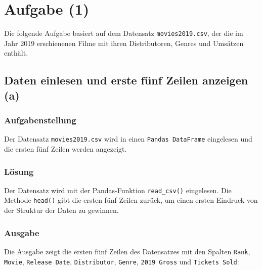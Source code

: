 
\chapter{Aufgabe (1)}
\label{chap:Aufgabe1}
\thispagestyle{fancy}

Die folgende Aufgabe basiert auf dem Datensatz \texttt{movies2019.csv}, der die im Jahr 2019 erschienenen Filme mit ihren Distributoren, Genres und Umsätzen enthält.


\section{Daten einlesen und erste fünf Zeilen anzeigen (a)}
\label{sec:1a}

\subsection{Aufgabenstellung}

Der Datensatz \texttt{movies2019.csv} wird in einen \texttt{Pandas DataFrame} eingelesen und die ersten fünf Zeilen werden angezeigt.

\subsection{Lösung}

Der Datensatz wird mit der Pandas-Funktion \texttt{read\_csv()} eingelesen. Die Methode \texttt{head()} gibt die ersten fünf Zeilen zurück, um einen ersten Eindruck von der Struktur der Daten zu gewinnen.



\subsection{Ausgabe}

Die Ausgabe zeigt die ersten fünf Zeilen des Datensatzes mit den Spalten \texttt{Rank}, \texttt{Movie}, \texttt{Release Date}, \texttt{Distributor}, \texttt{Genre}, \texttt{2019 Gross} und \texttt{Tickets Sold}:

